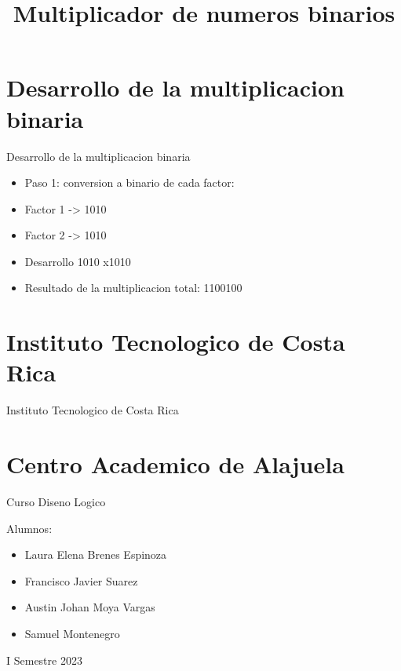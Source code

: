 \documentclass[11pt]{beamer}
\title{Multiplicador de numeros binarios}
\begin{document}
    \begin{frame}
        \maketitle
    \end{frame}
    \section{Desarrollo de la multiplicacion binaria}
    \begin{frame}{Desarrollo de la multiplicacion binaria}
        \begin{itemize}
        \item Paso 1: conversion a binario de cada factor:
        \item    Factor 1 -> 1010
        \item    Factor 2 -> 1010
        \item Desarrollo 
        \newline
      \hphantom{123456789101112}1010
        \newline      \hphantom{12345678910111}x1010
        \item Resultado de la multiplicacion total: 1100100
        \end{itemize}
    \end{frame}
    \section{Instituto Tecnologico de Costa Rica}
    \begin{frame}{Instituto Tecnologico de Costa Rica}    \section{Centro Academico de Alajuela}        Curso Diseno Logico 
        \newline

        Alumnos:
        \begin{itemize}
        \item Laura Elena Brenes Espinoza
        \item Francisco Javier Suarez 
        \item Austin Johan Moya Vargas
        \item Samuel Montenegro
        \end{itemize}

        I Semestre 2023
    \end{frame}
    
\end{document}
